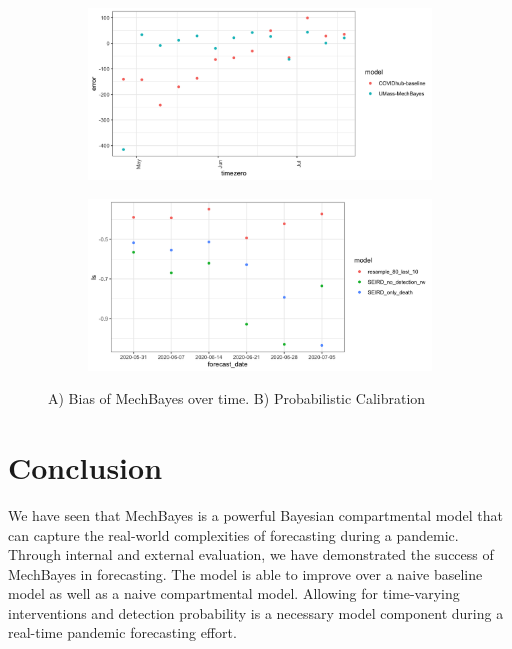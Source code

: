 \documentclass[11pt]{amsart}
\begin{document}
\begin{figure}
\begin{subfigure}{.5\textwidth}
\includegraphics[scale=.15]{bias_by_timezero.png}
\end{subfigure}%
\begin{subfigure}{.5\textwidth}
\includegraphics[scale=.15]{ablation_calibration.png}
\end{subfigure}
\caption{A) Bias of MechBayes over time. B) Probabilistic Calibration}
\label{fig:results_discussion}
\end{figure}



\section{Conclusion}

We have seen that MechBayes is a powerful Bayesian compartmental model that can capture the real-world complexities of forecasting during a pandemic. Through internal and external evaluation, we have demonstrated the success of MechBayes in forecasting. The model is able to improve over a naive baseline model as well as a naive compartmental model. Allowing for time-varying interventions and detection probability is a necessary model component during a real-time pandemic forecasting effort. 
\end{document}
